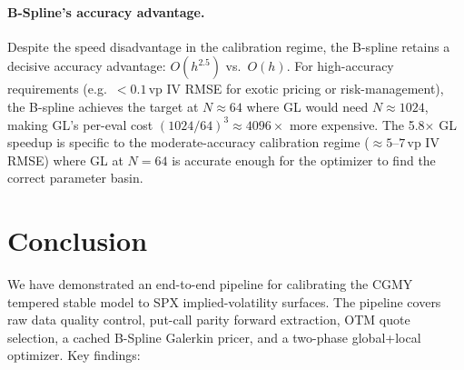 \documentclass[11pt,a4paper]{article}
\newcommand{\vp}{\text{vp}}     %
\begin{document}
\paragraph{B-Spline's accuracy advantage.}
Despite the speed disadvantage in the calibration regime, the B-spline
retains a decisive accuracy advantage: $O(h^{2.5})$ vs.\ $O(h)$.
For high-accuracy requirements (e.g.\ $< 0.1\,\vp$ IV RMSE for exotic
pricing or risk-management), the B-spline achieves the target at $N \approx
64$ where GL would need $N \approx 1024$, making GL's per-eval cost
$(1024/64)^3 \approx 4096\times$ more expensive.
The 5.8$\times$ GL speedup is specific to the moderate-accuracy calibration
regime ($\approx 5$--$7\,\vp$ IV RMSE) where GL at $N=64$ is accurate
enough for the optimizer to find the correct parameter basin.

\section{Conclusion}
\label{sec:conclusion}

We have demonstrated an end-to-end pipeline for calibrating the CGMY
tempered stable model to SPX implied-volatility surfaces.
The pipeline covers raw data quality control, put-call parity forward
extraction, OTM quote selection, a cached B-Spline Galerkin pricer, and
a two-phase global+local optimizer.
Key findings:
\end{document}
